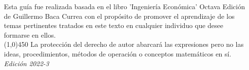 \documentclass[11pt,fleqn]{book} %
\numberwithin{equation}{section} %
\numberwithin{figure}{section} %
\numberwithin{table}{section} %
\begin{document}
\vspace{4mm}

\vspace{2mm}
\noindent Esta guía fue realizada basada en el libro 'Ingeniería Económica' Octava Edición de Guillermo Baca Currea con el propósito de promover el aprendizaje de los temas pertinentes tratados en este texto en cualquier individuo que desee formarse en ellos. \\
\line(1,0){450}
\vspace{2mm} La protección del derecho de autor abarcará las expresiones pero no las ideas, procedimientos, métodos de operación o conceptos matemáticos en sí.%
\noindent \textit{Edición 2022-3}

\clearpage

\pagestyle{empty} %
\tableofcontents %
\cleardoublepage %
\pagestyle{fancy} %
\graphicspath{ {img/} }%




















\end{document}
